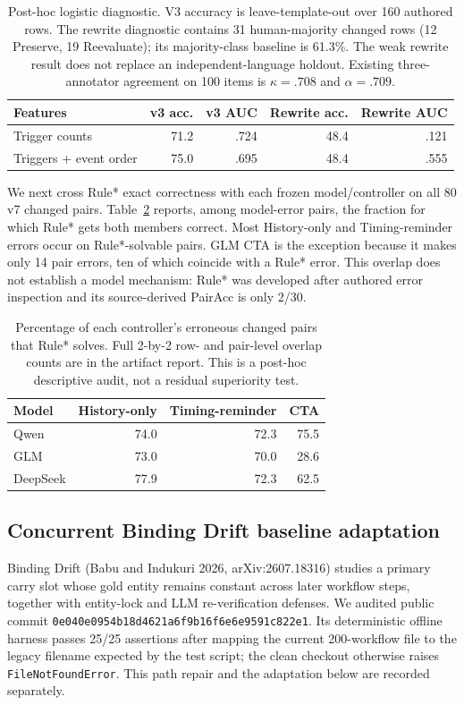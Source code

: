 \documentclass[10pt]{article}
\begin{document}
\begin{table}[H]
\centering
\small
\begin{tabular}{lrrrr}
\toprule
Features & v3 acc. & v3 AUC & Rewrite acc. & Rewrite AUC \\
\midrule
Trigger counts & 71.2 & .724 & 48.4 & .121 \\
Triggers + event order & 75.0 & .695 & 48.4 & .555 \\
\bottomrule
\end{tabular}
\caption{Post-hoc logistic diagnostic. V3 accuracy is leave-template-out over 160 authored rows.
The rewrite diagnostic contains 31 human-majority changed rows (12 Preserve, 19 Reevaluate); its
majority-class baseline is 61.3\%. The weak rewrite result does not replace an independent-language
holdout. Existing three-annotator agreement on 100 items is $\kappa=.708$ and $\alpha=.709$.}
\label{tab:supp-trigger-logistic}
\end{table}

We next cross Rule* exact correctness with each frozen model/controller on all 80 v7 changed
pairs. Table~\ref{tab:supp-rule-model-overlap} reports, among model-error pairs, the fraction for
which Rule* gets both members correct. Most History-only and Timing-reminder errors occur on
Rule*-solvable pairs. GLM CTA is the exception because it makes only 14 pair errors, ten of which
coincide with a Rule* error. This overlap does not establish a model mechanism: Rule* was developed
after authored error inspection and its source-derived PairAcc is only 2/30.

\begin{table}[H]
\centering
\small
\begin{tabular}{lrrr}
\toprule
Model & History-only & Timing-reminder & CTA \\
\midrule
Qwen & 74.0 & 72.3 & 75.5 \\
GLM & 73.0 & 70.0 & 28.6 \\
DeepSeek & 77.9 & 72.3 & 62.5 \\
\bottomrule
\end{tabular}
\caption{Percentage of each controller's erroneous changed pairs that Rule* solves. Full 2-by-2
row- and pair-level overlap counts are in the artifact report. This is a post-hoc descriptive
audit, not a residual superiority test.}
\label{tab:supp-rule-model-overlap}
\end{table}

\subsection{Concurrent Binding Drift baseline adaptation}
Binding Drift (Babu and Indukuri 2026, arXiv:2607.18316) studies a primary carry slot whose gold
entity remains constant across later workflow steps, together with entity-lock and LLM
re-verification defenses. We audited public commit
\texttt{0e040e0954b18d4621a6f9b16f6e6e9591c822e1}. Its deterministic offline harness passes
25/25 assertions after mapping the current 200-workflow file to the legacy filename expected by the
test script; the clean checkout otherwise raises \texttt{FileNotFoundError}. This path repair and
the adaptation below are recorded separately.
\end{document}
